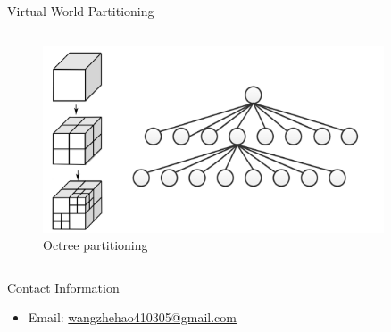\documentclass[final,hyperref={pdfpagelabels=false},20pt]{beamer}
\begin{document}
\begin{frame}[t]
\begin{columns}[t]
\begin{column}{.465\textwidth}
\begin{block}{Virtual World Partitioning}
\begin{columns}
\begin{column}{.47\textwidth}
\begin{figure}
\includegraphics[width=\linewidth]{Octrees}
\caption{Octree partitioning}
\label{fig:octrees}
\end{figure}
\end{column}
\end{columns}

\end{block}



\begin{block}{Contact Information}

\begin{itemize}
\item Email: \href{mailto:wangzhehao410305@gmail.com}{wangzhehao410305@gmail.com}
\end{itemize}

\end{block}

\end{column} %

\begin{column}{.02\textwidth}\end{column} %
 
\begin{column}{.465\textwidth} %



\end{column}
\end{columns}
\end{frame}
\end{document}
